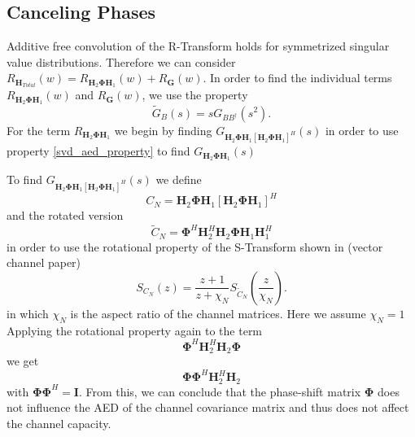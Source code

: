 \documentclass[12pt,a4paper]{report}
\begin{document}
\subsection{Canceling Phases}
Additive free convolution of the R-Transform holds for symmetrized singular value distributions. Therefore we can consider $R_{\mathbf{H}_{Total}}(w) = R_{\mathbf{H}_{2}\boldsymbol{\Phi}\mathbf{H}_{1}}(w) + R_{\mathbf{G}}(w)$. In order to find the individual terms $R_{\mathbf{H}_{2}\boldsymbol{\Phi}\mathbf{H}_{1}}(w)$ and $R_{\mathbf{G}}(w)$, we use the property 
\begin{equation}\label{svd_aed_property}
\tilde{G}_{B}(s) = sG_{BB^{\dagger}}(s^2).
\end{equation}
For the term $R_{\mathbf{H}_{2}\boldsymbol{\Phi}\mathbf{H}_{1}}$ we begin by finding 
$G_{\mathbf{H}_{2}\boldsymbol{\Phi}\mathbf{H}_{1}[\mathbf{H}_{2}\boldsymbol{\Phi}\mathbf{H}_{1}]^H}(s)$ in order to use property \eqref{svd_aed_property} to find $G_{\mathbf{H}_{2}\boldsymbol{\Phi}\mathbf{H}_{1}}(s)$
\par
To find $G_{\mathbf{H}_{2}\boldsymbol{\Phi}\mathbf{H}_{1}[\mathbf{H}_{2}\boldsymbol{\Phi}\mathbf{H}_{1}]^H}(s)$ we define
\begin{equation}
C_N = \mathbf{H}_{2}\boldsymbol{\Phi}\mathbf{H}_{1}[\mathbf{H}_{2}\boldsymbol{\Phi}\mathbf{H}_{1}]^H
\end{equation}
and the rotated version 
\begin{equation}
\tilde{C}_N = \boldsymbol{\Phi}^H\mathbf{H}_{2}^H\mathbf{H}_{2}\boldsymbol{\Phi}\mathbf{H}_{1}\mathbf{H}_{1}^H
\end{equation} in order to use the rotational property of the S-Transform shown in (vector channel paper)
\begin{equation}\label{rotation_property}
S_{C_N}(z) = \frac{z+1}{z+\chi_N} S_{\tilde{C}_N}(\frac{z}{\chi_N}).
\end{equation}
in which $\chi_N$ is the aspect ratio of the channel matrices. Here we assume $\chi_N = 1$
Applying the rotational property again to the term 
\begin{equation}
\boldsymbol{\Phi}^H\mathbf{H}_{2}^H\mathbf{H}_{2}\boldsymbol{\Phi}
\end{equation}
we get 
\begin{equation}
\boldsymbol{\Phi}\boldsymbol{\Phi}^H\mathbf{H}_{2}^H\mathbf{H}_{2}
\end{equation}
with $\boldsymbol{\Phi}\boldsymbol{\Phi}^H = \mathbf{I}$.
From this, we can conclude that the phase-shift matrix $\boldsymbol{\Phi}$ does not influence the
AED of the channel covariance matrix and thus does not affect the channel capacity. 
\end{document}

